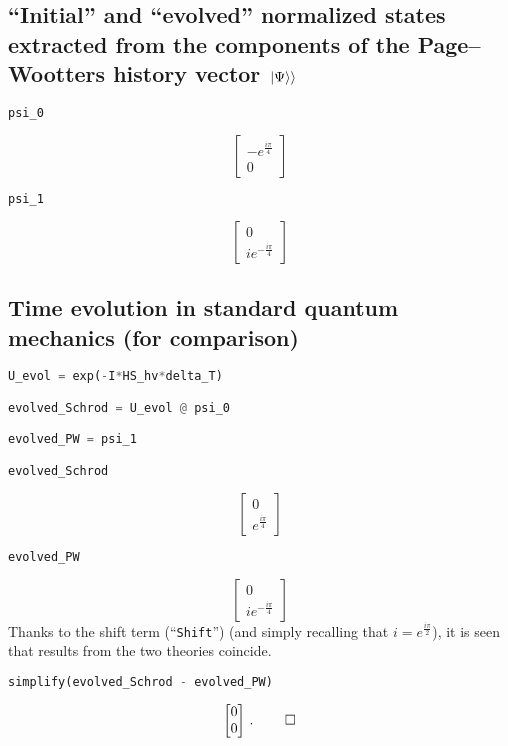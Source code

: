 \subsection*{``Initial'' and ``evolved'' normalized states extracted from the components of the Page--Wootters history vector $\left.\left| \Psi \right\rangle\right\rangle$}

\begin{lstlisting}[language=Python]
psi_0
\end{lstlisting}
$$
  \left[\begin{matrix}- e^{\frac{i \pi}{4}}\\0\end{matrix}\right]
$$
\begin{lstlisting}[language=Python]
psi_1
\end{lstlisting}
$$
  \left[\begin{matrix}0\\i e^{- \frac{i \pi}{4}}\end{matrix}\right]
$$

\subsection*{Time evolution in standard quantum mechanics (for comparison)}

\begin{lstlisting}[language=Python]
U_evol = exp(-I*HS_hv*delta_T)

evolved_Schrod = U_evol @ psi_0

evolved_PW = psi_1

evolved_Schrod
\end{lstlisting}
$$
  \left[\begin{matrix}0\\e^{\frac{i \pi}{4}}\end{matrix}\right]
$$
\begin{lstlisting}[language=Python]
evolved_PW
\end{lstlisting}
$$
  \left[\begin{matrix}0\\i e^{- \frac{i \pi}{4}}\end{matrix}\right]
$$
Thanks to the shift term (``\verb|Shift|'')
(and simply recalling that $i=e^{\frac{i\pi}{2}}$),
it is seen that
results from the two theories coincide.
\begin{lstlisting}[language=Python]
simplify(evolved_Schrod - evolved_PW)
\end{lstlisting}
$$
  \left[\begin{matrix}0\\0\end{matrix}\right] \, \text{.} \; \qed
$$